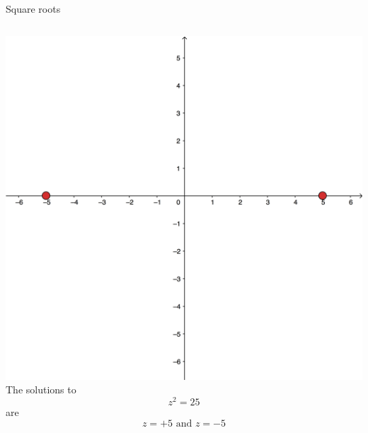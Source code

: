 \documentclass{beamer}
\begin{document}
\begin{frame}{Square roots}
\begin{columns}
\includegraphics[scale=0.4]{root-25.png}
The solutions to
\begin{equation*}
	z^2 = 25
\end{equation*}
are
\begin{equation*}
z=+5\text{ and } z=-5
\end{equation*}
\end{columns}
\end{frame}
\end{document}
